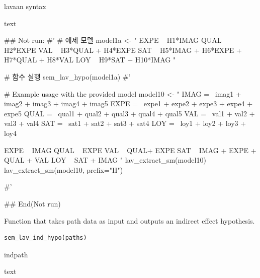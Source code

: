 \documentclass[a4paper]{book}
\begin{document}
%
\begin{Arguments}
\begin{ldescription}
\item[\code{model}] lavaan syntax
\end{ldescription}
\end{Arguments}
%
\begin{Value}
text
\end{Value}
%
\begin{Examples}
\begin{ExampleCode}

## Not run: 
#'
# 예제 모델
model1a <- "
EXPE ~ H1*IMAG
QUAL ~ H2*EXPE
VAL ~  H3*QUAL + H4*EXPE
SAT ~ H5*IMAG + H6*EXPE + H7*QUAL + H8*VAL
LOY ~ H9*SAT + H10*IMAG
"

# 함수 실행
sem_lav_hypo(model1a)
#'

# Example usage with the provided model
model10 <- "
IMAG =~ imag1 + imag2 + imag3 + imag4 + imag5
EXPE =~ expe1 + expe2 + expe3 + expe4 + expe5
QUAL =~ qual1 + qual2 + qual3 + qual4 + qual5
VAL =~ val1 + val2 + val3 + val4
SAT =~ sat1 + sat2 + sat3 + sat4
LOY =~ loy1 + loy2 + loy3 + loy4

EXPE ~ IMAG
QUAL ~ EXPE
VAL ~  QUAL+ EXPE
SAT ~ IMAG + EXPE + QUAL + VAL
LOY ~ SAT + IMAG
"
lav_extract_sm(model10)%
lav_extract_sm(model10, prefix="H")%



#'

## End(Not run)

\end{ExampleCode}
\end{Examples}
%
\begin{Description}
Function that takes path data as input and outputs an indirect effect hypothesis.
\end{Description}
%
\begin{Usage}
\begin{verbatim}
sem_lav_ind_hypo(paths)
\end{verbatim}
\end{Usage}
%
\begin{Arguments}
\begin{ldescription}
\item[\code{paths}] indpath
\end{ldescription}
\end{Arguments}
%
\begin{Value}
text
\end{Value}
\end{document}
